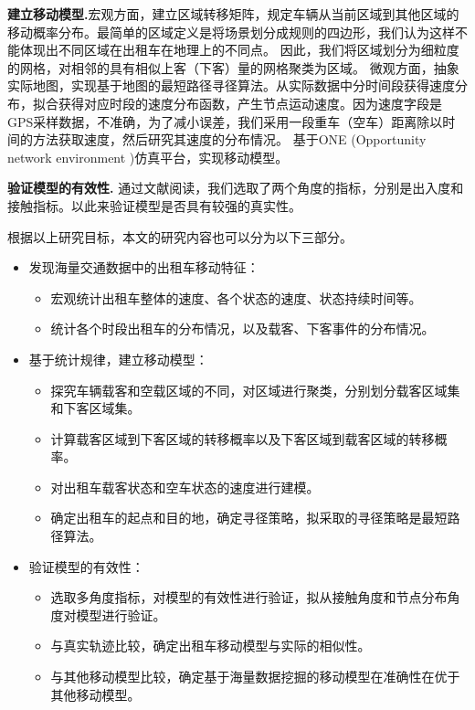    \textbf{建立移动模型.}宏观方面，建立区域转移矩阵，规定车辆从当前区域到其他区域的移动概率分布。最简单的区域定义是将场景划分成规则的四边形，我们认为这样不能体现出不同区域在出租车在地理上的不同点。
因此，我们将区域划分为细粒度的网格，对相邻的具有相似上客（下客）量的网格聚类为区域。
微观方面，抽象实际地图，实现基于地图的最短路径寻径算法。从实际数据中分时间段获得速度分布，拟合获得对应时段的速度分布函数，产生节点运动速度。因为速度字段是GPS采样数据，不准确，为了减小误差，我们采用一段重车（空车）距离除以时间的方法获取速度，然后研究其速度的分布情况。
基于ONE (Opportunity network environment )仿真平台，实现移动模型。

  \textbf{验证模型的有效性.}
通过文献阅读，我们选取了两个角度的指标，分别是出入度和接触指标。以此来验证模型是否具有较强的真实性。


根据以上研究目标，本文的研究内容也可以分为以下三部分。
\begin{itemize}
  \item 发现海量交通数据中的出租车移动特征：
  \begin{itemize}
  \item 宏观统计出租车整体的速度、各个状态的速度、状态持续时间等。
  \item 统计各个时段出租车的分布情况，以及载客、下客事件的分布情况。
  \end{itemize}
 \item 基于统计规律，建立移动模型：
 \begin{itemize}
 \item 探究车辆载客和空载区域的不同，对区域进行聚类，分别划分载客区域集和下客区域集。
 \item 计算载客区域到下客区域的转移概率以及下客区域到载客区域的转移概率。
 \item 对出租车载客状态和空车状态的速度进行建模。
 \item 确定出租车的起点和目的地，确定寻径策略，拟采取的寻径策略是最短路径算法。
 \end{itemize}
 \item 验证模型的有效性：
  \begin{itemize}
  \item 选取多角度指标，对模型的有效性进行验证，拟从接触角度和节点分布角度对模型进行验证。
  \item 与真实轨迹比较，确定出租车移动模型与实际的相似性。
  \item 与其他移动模型比较，确定基于海量数据挖掘的移动模型在准确性在优于其他移动模型。
 \end{itemize}
\end{itemize}

